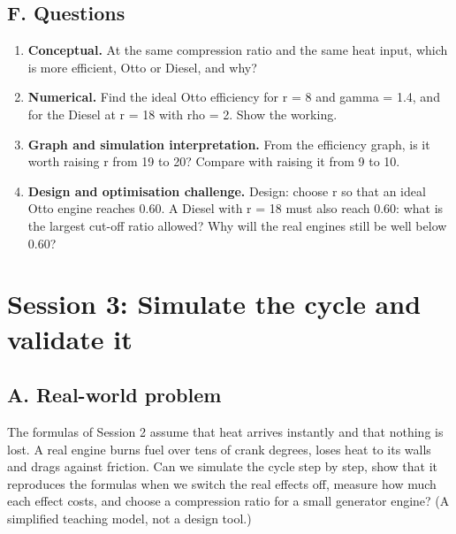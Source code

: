 \documentclass[11pt,a4paper]{article}
\begin{document}
\subsection*{F. Questions}
\begin{enumerate}[nosep]
\item \textbf{Conceptual.} At the same compression ratio and the same heat input, which is more efficient, Otto or Diesel, and why?
\item \textbf{Numerical.} Find the ideal Otto efficiency for r = 8 and gamma = 1.4, and for the Diesel at r = 18 with rho = 2. Show the working.
\item \textbf{Graph and simulation interpretation.} From the efficiency graph, is it worth raising r from 19 to 20? Compare with raising it from 9 to 10.
\item \textbf{Design and optimisation challenge.} Design: choose r so that an ideal Otto engine reaches 0.60. A Diesel with r = 18 must also reach 0.60: what is the largest cut-off ratio allowed? Why will the real engines still be well below 0.60?
\end{enumerate}

\section{Session 3: Simulate the cycle and validate it}

\subsection*{A. Real-world problem}
The formulas of Session 2 assume that heat arrives instantly and that nothing is lost. A real engine burns fuel over tens of crank degrees, loses heat to its walls and drags against friction. Can we simulate the cycle step by step, show that it reproduces the formulas when we switch the real effects off, measure how much each effect costs, and choose a compression ratio for a small generator engine? (A simplified teaching model, not a design tool.)
\end{document}
